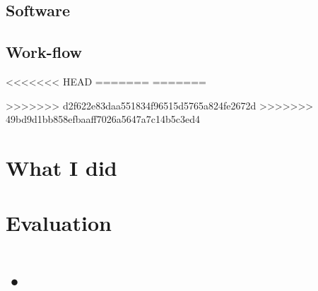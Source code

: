 \documentclass[11pt,a4paper]{report}
\begin{document}
\subsection{Software}

\subsection{Work-flow}
<<<<<<< HEAD
=======
=======

>>>>>>> d2f622e83daa551834f96515d5765a824fe2672d
>>>>>>> 49bd9d1bb858efbaaff7026a5647a7c14b5c3ed4


\section{What I did}



\section{Evaluation}



\section{•}
\end{document}
